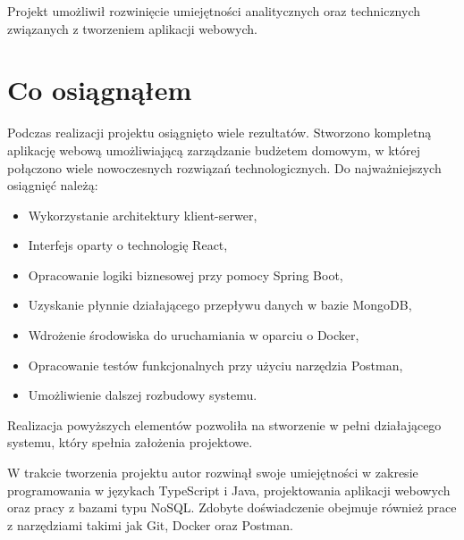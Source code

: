 Projekt umożliwił rozwinięcie umiejętności analitycznych oraz technicznych związanych z tworzeniem aplikacji webowych.

\section*{Co osiągnąłem}
Podczas realizacji projektu osiągnięto wiele rezultatów. Stworzono kompletną aplikację webową umożliwiającą zarządzanie budżetem domowym, w której połączono wiele nowoczesnych rozwiązań technologicznych. Do najważniejszych osiągnięć należą:
\begin{itemize}
	\item Wykorzystanie architektury klient-serwer,
	\item Interfejs oparty o technologię React,
	\item Opracowanie logiki biznesowej przy pomocy Spring Boot,
	\item Uzyskanie płynnie działającego przepływu danych w bazie MongoDB,
	\item Wdrożenie środowiska do uruchamiania w oparciu o Docker,
	\item Opracowanie testów funkcjonalnych przy użyciu narzędzia Postman,
	\item Umożliwienie dalszej rozbudowy systemu.
\end{itemize}

Realizacja powyższych elementów pozwoliła na stworzenie w pełni działającego systemu, który spełnia założenia projektowe. 

W trakcie tworzenia projektu autor rozwinął swoje umiejętności w zakresie programowania w językach TypeScript i Java, projektowania aplikacji webowych oraz pracy z bazami typu NoSQL. Zdobyte doświadczenie obejmuje również prace z narzędziami takimi jak Git, Docker oraz Postman.